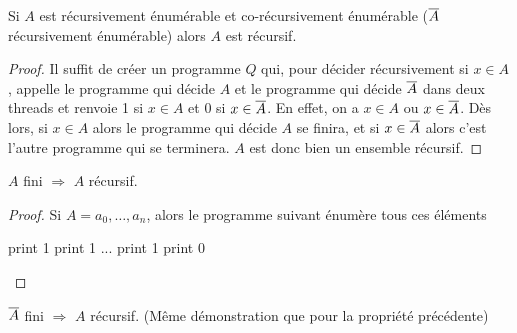 \begin{myprop}
    Si $A$ est récursivement énumérable et co-récursivement énumérable ($\overline{A}$ récursivement énumérable)
    alors $A$ est récursif.
    \begin{proof}
      Il suffit de créer un programme $Q$ qui, pour décider récursivement si $x \in A$, 
	  appelle le programme qui décide $A$ et le programme qui décide $\overline{A}$ dans deux 
	  threads et renvoie 1 si $x \in A$ et 0 si $x \in \overline{A}$. En effet, on a 
	  $x \in A$ ou $x \in \overline{A}$. Dès lors, si $x \in A$ alors le programme qui décide 
	  $A$ se finira, et si $x \in \overline{A}$ alors c'est l'autre programme qui se terminera. 
	  $A$ est donc bien un ensemble récursif.
    \end{proof}
\end{myprop}

\begin{myprop}
	$A$ fini $\Rightarrow$ $A$ récursif.
    \begin{proof}
      Si $A= {a_0, \ldots, a_n}$, alors le programme suivant énumère tous ces éléments
      \begin{algorithmic}
        \STATE print 1
        \STATE print 1
        \STATE ...
        \STATE print 1
        \ELSE
        \STATE print 0
        \ENDIF
      \end{algorithmic}
    \end{proof}
\end{myprop}

\begin{myprop}
	$\overline{A}$ fini $\Rightarrow$ $A$ récursif. (Même démonstration que pour la propriété précédente)
\end{myprop}

